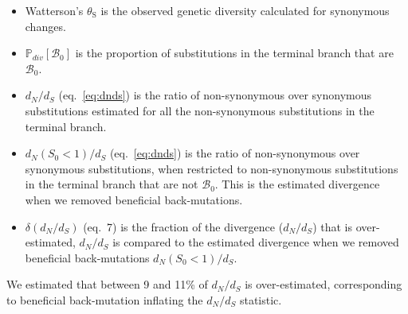 \documentclass[12pt]{article}
\newcommand{\proba}{\mathbb{P}}
\newcommand{\dn}{d_N}
\newcommand{\ds}{d_S}
\newcommand{\dnds}{\dn / \ds}
\newcommand{\Sphy}{S_{0}}
\newcommand{\SphyBen}{\mathcal{B}_0}
\newcommand{\thetaSyn}{\theta_{\text{S}}}
\begin{document}
    \begin{itemize}
        \item Watterson's $\thetaSyn$ is the observed genetic diversity calculated for synonymous changes.
        \item $\proba_{div}[\SphyBen]$ is the proportion of substitutions in the terminal branch that are $\SphyBen$.
        \item $\dnds$ (eq.~\ref{eq:dnds}) is the ratio of non-synonymous over synonymous substitutions estimated for all the non-synonymous substitutions in the terminal branch.
        \item $\dn(\Sphy < 1) / \ds$ (eq.~\ref{eq:dnds}) is the ratio of non-synonymous over synonymous substitutions, when restricted to non-synonymous substitutions in the terminal branch that are not $\SphyBen$.
        This is the estimated divergence when we removed beneficial back-mutations.
        \item $\delta(\dnds)$ (eq.~7) is the fraction of the divergence ($\dnds$) that is over-estimated, $\dnds$ is compared to the estimated divergence when we removed beneficial back-mutations $\dn(\Sphy < 1) / \ds$.
    \end{itemize}
    We estimated that between 9 and 11\% of $\dnds$ is over-estimated, corresponding to beneficial back-mutation inflating the $\dnds$ statistic.

    \newpage
\end{document}
